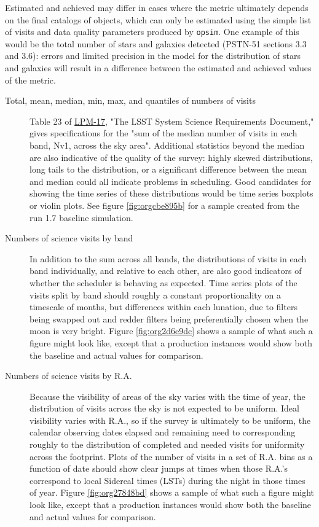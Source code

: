 Estimated and achieved may differ in cases where the metric ultimately depends on the final catalogs of objects, which can only be estimated using the simple list of visits and data quality parameters produced by \texttt{opsim}.
One example of this would be the total number of stars and galaxies detected (PSTN-51 sections 3.3 and 3.6): errors and limited precision in the model for the distribution of stars and galaxies will result in a difference between the estimated and achieved values of the metric.

\begin{description}
\item[{Total, mean, median, min, max, and quantiles of numbers of visits}] Table 23 of \href{http://ls.st/lpm-17}{LPM-17}, "The LSST System Science Requirements Document," gives specifications for the "sum of the median number of visits in each band, Nv1, across the sky area". Additional statistics beyond the median are also indicative of the quality of the survey: highly skewed distributions, long tails to the distribution, or a significant difference between the mean and median could all indicate problems in scheduling. Good candidates for showing the time series of these distributions would be time series boxplots or violin plots. See figure \ref{fig:orgcbe895b} for a sample created from the run 1.7 baseline simulation.
\item[{Numbers of science visits by band}] In addition to the sum across all bands, the distributions of visits in each band individually, and relative to each other, are also good indicators of whether the scheduler is behaving as expected. Time series plots of the visits split by band should roughly a constant proportionality on a timescale of months, but differences within each lunation, due to filters being swapped out and redder filters being preferentially chosen when the moon is very bright. Figure \ref{fig:org2d6e9dc} shows a sample of what such a figure might look like, except that a production instances would show both the baseline and actual values for comparison.
\item[{Numbers of science visits by R.A.}] Because the visibility of areas of the sky varies with the time of year, the distribution of visits across the sky is not expected to be uniform. Ideal visibility varies with R.A., so if the survey is ultimately to be uniform, the calendar observing dates elapsed and remaining need to corresponding roughly to the distribution of completed and needed visits for uniformity across the footprint. Plots of the number of visits in a set of R.A. bins as a function of date should show clear jumps at times when those R.A.'s correspond to local Sidereal times (LSTs) during the night in those times of year. Figure \ref{fig:org27848bd} shows a sample of what such a figure might look like, except that a production instances would show both the baseline and actual values for comparison.

\end{description}
